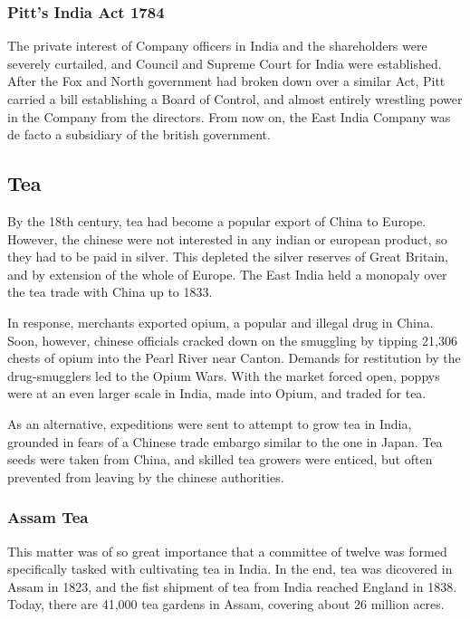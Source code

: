 \documentclass[11pt, a4paper, headings=standardclasses]{scrartcl}
\begin{document}
\subsubsection{Pitt's India Act 1784}

The private interest of Company officers in India and the shareholders were severely curtailed, and Council and Supreme Court for India were established. After the Fox and North government had broken down over a similar Act, Pitt carried a bill establishing a Board of Control, and almost entirely wrestling power in the Company from the directors. From now on, the East India Company was de facto a subsidiary of the british government.\autocite[396]{RF, parliament}

\subsection{Tea}

By the 18th century, tea had become a popular export of China to Europe. However, the chinese were not interested in any indian or european product, so they had to be paid in silver. This depleted the silver reserves of Great Britain, and by extension of the whole of Europe.\autocite[214]{Tea} The East India held a monopaly over the tea trade with China up to 1833\autocite{parliament}.

In response, merchants exported opium, a popular and illegal drug in China.\autocite[215]{Tea} Soon, however, chinese officials cracked down on the smuggling by tipping 21,306 chests of opium into the Pearl River near Canton.\autocite[203]{Tea} Demands for restitution by the drug-smugglers led to the Opium Wars.\autocite{Opium} With the market forced open, poppys were at an even larger scale in India, made into Opium, and traded for tea.\autocite[218-219]{Tea}

As an alternative, expeditions were sent to attempt to grow tea in India, grounded in fears of a Chinese trade embargo similar to the one in Japan.\autocite[211]{Tea} Tea seeds were taken from China, and skilled tea growers were enticed, but often prevented from leaving by the chinese authorities.\autocite[210]{Tea}

\subsubsection{Assam Tea}

This matter was of so great importance that a committee of twelve was formed specifically tasked with cultivating tea in India.\autocite{Tea} In the end, tea was dicovered in Assam in 1823,\autocite[209]{Tea} and the fist shipment of tea from India reached England in 1838. Today, there are 41,000 tea gardens in Assam, covering about 26 million acres.\autocite{roy}
\end{document}
